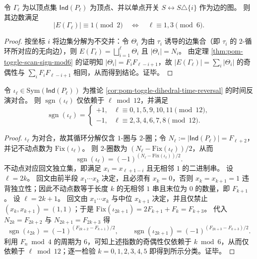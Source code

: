 \begin{corollary}\label{cor:pom-toggle-fibcube-edge-parity}
令 \(\Gamma_\ell\) 为以顶点集 \(\mathsf{Ind}(P_\ell)\) 为顶点、并以单点开关 \(S\leftrightarrow S\triangle\{i\}\) 作为边的图。
则其边数满足
\[
|E(\Gamma_\ell)|\equiv 1\pmod 2\quad\Longleftrightarrow\quad \ell\equiv 1,3\pmod 6.
\]
\end{corollary}

\begin{proof}
按坐标 \(i\) 将边集分解为不交并：令 \(\Theta_i\) 为由 \(\tau_i\) 诱导的边集合（即 \(\tau_i\) 的 \(2\)-循环所对应的无向边），则 \(E(\Gamma_\ell)=\bigsqcup_{i=1}^{\ell}\Theta_i\) 且 \(|\Theta_i|=N_i\)。
由定理 \ref{thm:pom-toggle-scan-sign-mod6} 的证明知 \(|\Theta_i|=F_iF_{\ell-i+1}\)，故
\(
|E(\Gamma_\ell)|=\sum_i|\Theta_i|
\)
的奇偶性与 \(\sum_iF_iF_{\ell-i+1}\) 相同，从而得到结论。证毕。
\end{proof}

\begin{theorem}\label{thm:pom-toggle-time-reversal-sign-mod12}
令 \(\iota_\ell\in\mathrm{Sym}(\mathsf{Ind}(P_\ell))\) 为推论 \ref{cor:pom-toggle-dihedral-time-reversal} 的时间反演对合。
则 \(\operatorname{sgn}(\iota_\ell)\) 仅依赖于 \(\ell\bmod 12\)，并满足
\[
\operatorname{sgn}(\iota_\ell)=
\begin{cases}
+1,& \ell\equiv 0,1,5,9,10,11\pmod{12},\\
-1,& \ell\equiv 2,3,4,6,7,8\pmod{12}.
\end{cases}
\]
\end{theorem}

\begin{proof}
\(\iota_\ell\) 为对合，故其循环分解仅含 \(1\)-圈与 \(2\)-圈；令 \(N_\ell:=|\mathsf{Ind}(P_\ell)|=F_{\ell+2}\)，并记不动点数为 \(\mathrm{Fix}(\iota_\ell)\)。
则 \(2\)-圈数为 \((N_\ell-\mathrm{Fix}(\iota_\ell))/2\)，从而
\[
\operatorname{sgn}(\iota_\ell)=(-1)^{(N_\ell-\mathrm{Fix}(\iota_\ell))/2}.
\]
不动点对应回文独立集，即满足 \(x_i=x_{\ell+1-i}\) 且无相邻 \(1\) 的二进制串。
设 \(\ell=2k\)。
回文由前半段 \(x_1\cdots x_k\) 决定，且必须有 \(x_k=0\)，否则 \(x_k=x_{k+1}=1\) 违背独立性；因此不动点数等于长度 \(k\) 的无相邻 \(1\) 串且末位为 \(0\) 的数量，即 \(F_{k+1}\)。
设 \(\ell=2k+1\)。
回文由 \(x_1\cdots x_k\) 与中位 \(x_{k+1}\) 决定，并且仅禁止 \((x_k,x_{k+1})=(1,1)\)；于是
\(
\mathrm{Fix}(\iota_{2k+1})=2F_{k+1}+F_k=F_{k+3}
\)。
代入 \(N_{2k}=F_{2k+2}\) 与 \(N_{2k+1}=F_{2k+3}\) 得
\[
\operatorname{sgn}(\iota_{2k})=(-1)^{(F_{2k+2}-F_{k+1})/2},
\qquad
\operatorname{sgn}(\iota_{2k+1})=(-1)^{(F_{2k+3}-F_{k+3})/2}.
\]
利用 \(F_n\bmod 4\) 的周期为 \(6\)，可知上述指数的奇偶性仅依赖于 \(k\bmod 6\)，从而仅依赖于 \(\ell\bmod 12\)；逐一检验 \(k=0,1,2,3,4,5\) 即得到所示分类。证毕。
\end{proof}

